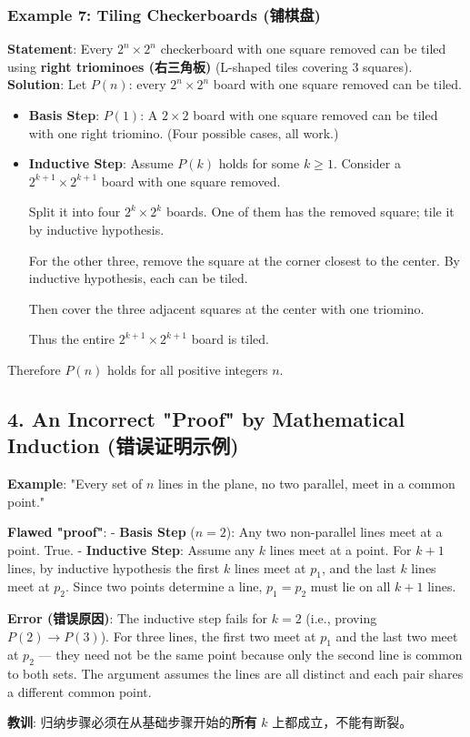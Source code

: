 \documentclass[10pt,a4paper,openany]{ctexbook}
\theoremstyle{definition}
\theoremstyle{remark}
\renewenvironment{quote}
  {\list{}{\leftmargin=1em\rightmargin=0pt\topsep=0.5pt\partopsep=0pt}\item[]}
  {\endlist}
\begin{document}
\subsubsection{Example 7: Tiling Checkerboards (铺棋盘)}

\textbf{Statement}: Every $2^n \times 2^n$ checkerboard with one square removed can be tiled using \textbf{right triominoes (右三角板)} (L-shaped tiles covering 3 squares).
\textbf{Solution}:
Let $P(n)$: every $2^n \times 2^n$ board with one square removed can be tiled.
\begin{itemize}
\item \textbf{Basis Step}: $P(1)$: A $2 \times 2$ board with one square removed can be tiled with one right triomino. (Four possible cases, all work.)
\item \textbf{Inductive Step}: Assume $P(k)$ holds for some $k \ge 1$.
Consider a $2^{k+1} \times 2^{k+1}$ board with one square removed.

Split it into four $2^k \times 2^k$ boards. One of them has the removed square; tile it by inductive hypothesis.

For the other three, remove the square at the corner closest to the center. By inductive hypothesis, each can be tiled.

Then cover the three adjacent squares at the center with one triomino.

Thus the entire $2^{k+1} \times 2^{k+1}$ board is tiled.


\end{itemize}

Therefore $P(n)$ holds for all positive integers $n$.
\vspace{-2pt}

\subsection{4. An Incorrect "Proof" by Mathematical Induction (错误证明示例)}

\begin{quote}
\textbf{Example}: "Every set of $n$ lines in the plane, no two parallel, meet in a common point."

\textbf{Flawed "proof"}:
- \textbf{Basis Step} ($n=2$): Any two non-parallel lines meet at a point. True.
- \textbf{Inductive Step}: Assume any $k$ lines meet at a point. For $k+1$ lines, by inductive hypothesis the first $k$ lines meet at $p_1$, and the last $k$ lines meet at $p_2$. Since two points determine a line, $p_1 = p_2$ must lie on all $k+1$ lines.

\textbf{Error (错误原因)}: The inductive step fails for $k=2$ (i.e., proving $P(2) \to P(3)$). For three lines, the first two meet at $p_1$ and the last two meet at $p_2$ — they need not be the same point because only the second line is common to both sets. The argument assumes the lines are all distinct and each pair shares a different common point.

\textbf{教训}: 归纳步骤必须在从基础步骤开始的\textbf{所有} $k$ 上都成立，不能有断裂。

\end{quote}
\vspace{-2pt}
\end{document}
